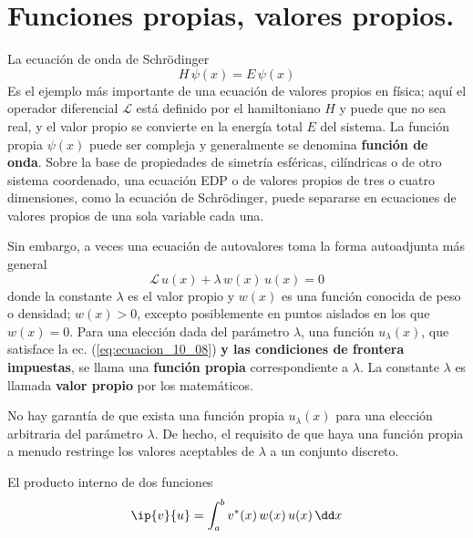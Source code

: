 \section{Funciones propias, valores propios.}
La ecuación de onda de Schrödinger
\[ H \, \psi (x) = E \, \psi (x) \]
Es el ejemplo más importante de una ecuación de valores propios en física; aquí el operador diferencial $\mathcal{L}$ está definido por el hamiltoniano $H$ y puede que no sea real, y el valor propio se convierte en la energía total $E$ del sistema. La función propia $\psi (x)$ puede ser compleja y generalmente se denomina \textbf{función de onda}. Sobre la base de propiedades de simetría esféricas, cilíndricas o de otro sistema coordenado, una ecuación EDP o de valores propios de tres o cuatro dimensiones, como la ecuación de Schrödinger, puede separarse en ecuaciones de valores propios de una sola variable cada una.
\par
Sin embargo, a veces una ecuación de autovalores toma la forma autoadjunta más general
\begin{equation}
\mathcal{L} \, u(x) + \lambda \, w(x) \, u(x) = 0
\label{eq:ecuacion_10_08}
\end{equation}
donde la constante $\lambda$ es el valor propio y $w(x)$ es una función conocida de peso o densidad; $w(x)>0$, excepto posiblemente en puntos aislados en los que $w(x) = 0$. Para una elección dada del parámetro $\lambda$, una función $u_{\lambda}(x)$, que satisface la ec. (\ref{eq:ecuacion_10_08}) \textbf{y las condiciones de frontera impuestas}, se llama una \textbf{función propia} correspondiente a $\lambda$. La constante $\lambda$ es llamada \textbf{valor propio} por los matemáticos.
\par
No hay garantía de que exista una función propia $u_{\lambda} (x)$ para una elección arbitraria del parámetro $\lambda$. De hecho, el requisito de que haya una función propia a menudo restringe los valores aceptables de $\lambda$ a un conjunto discreto. 
\par
El producto interno de dos funciones
\[ \ip{v}{u} = \int_{a}^{b} v^{*}(x) \, w(x) \, u(x) \, \dd x \]
